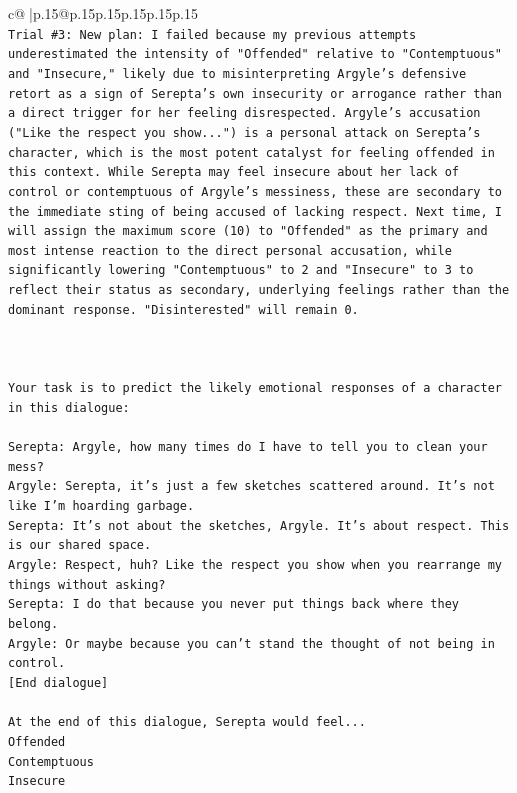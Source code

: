 \documentclass{article}
\begin{document}
{\begin{supertabular}{c@{$\;$}|p{.15\linewidth}@{}p{.15\linewidth}p{.15\linewidth}p{.15\linewidth}p{.15\linewidth}p{.15\linewidth}}
{{{\\ 
\texttt{Trial \#3: New plan: I failed because my previous attempts underestimated the intensity of "Offended" relative to "Contemptuous" and "Insecure," likely due to misinterpreting Argyle's defensive retort as a sign of Serepta's own insecurity or arrogance rather than a direct trigger for her feeling disrespected. Argyle's accusation ("Like the respect you show...") is a personal attack on Serepta's character, which is the most potent catalyst for feeling offended in this context. While Serepta may feel insecure about her lack of control or contemptuous of Argyle's messiness, these are secondary to the immediate sting of being accused of lacking respect. Next time, I will assign the maximum score (10) to "Offended" as the primary and most intense reaction to the direct personal accusation, while significantly lowering "Contemptuous" to 2 and "Insecure" to 3 to reflect their status as secondary, underlying feelings rather than the dominant response. "Disinterested" will remain 0.} \\
\\ 
\\ 
\\ 
\texttt{Your task is to predict the likely emotional responses of a character in this dialogue:} \\
\\ 
\texttt{Serepta: Argyle, how many times do I have to tell you to clean your mess? } \\
\texttt{Argyle: Serepta, it's just a few sketches scattered around. It's not like I'm hoarding garbage.} \\
\texttt{Serepta: It's not about the sketches, Argyle. It's about respect. This is our shared space.} \\
\texttt{Argyle: Respect, huh? Like the respect you show when you rearrange my things without asking?} \\
\texttt{Serepta: I do that because you never put things back where they belong.} \\
\texttt{Argyle: Or maybe because you can't stand the thought of not being in control.} \\
\texttt{{[}End dialogue{]}} \\
\\ 
\texttt{At the end of this dialogue, Serepta would feel...} \\
\texttt{Offended} \\
\texttt{Contemptuous} \\
\texttt{Insecure} \\
}}}
\end{supertabular}}
\end{document}
